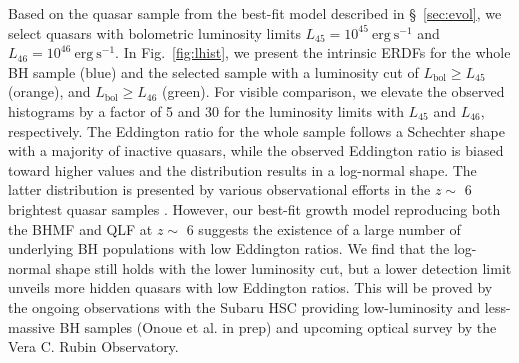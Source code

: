 \documentclass[twocolumn, twocolappendix]{aastex63}
\newcommand{\Lbol}{L_\mathrm{bol}}
\begin{document}
\begin{CJK*}{UTF8}{gbsn}
Based on the quasar sample from the best-fit model described in \S~\ref{sec:evol}, 
we select quasars with bolometric luminosity limits $L_{45}=10^{45}~\mathrm{erg~s^{-1}}$ and $L_{46}=10^{46}~\mathrm{erg~s^{-1}}$.
In Fig.~\ref{fig:lhist}, we present the intrinsic ERDFs for the whole BH sample (blue)
and the selected sample with a luminosity cut of $\Lbol \geq L_{45}$ (orange),
and $\Lbol \geq L_{46}$ (green).
For visible comparison, we elevate the observed histograms by a factor of 5 and 30
for the luminosity limits with $L_{45}$ and $L_{46}$, respectively.
The Eddington ratio for the whole sample follows a Schechter shape with a majority of inactive quasars, 
while the observed Eddington ratio is biased toward higher values and the distribution results in a log-normal shape. 
The latter distribution is presented by various observational efforts in the $z\sim$ 6 brightest quasar samples 
\citep[e.g.,][]{2010AJ....140..546W,2019ApJ...873...35S,2022arXiv220705113F}.
However, our best-fit growth model reproducing both the BHMF and QLF at $z\sim$ 6 suggests the existence of
a large number of underlying BH populations with low Eddington ratios. 
We find that the log-normal shape still holds with the lower luminosity cut, 
but a lower detection limit unveils more hidden quasars with low Eddington ratios. 
This will be proved by the ongoing observations with the Subaru HSC providing low-luminosity and less-massive BH samples
(Onoue et al. in prep) and upcoming optical survey by the Vera C. Rubin Observatory.




\end{CJK*}
\end{document}
